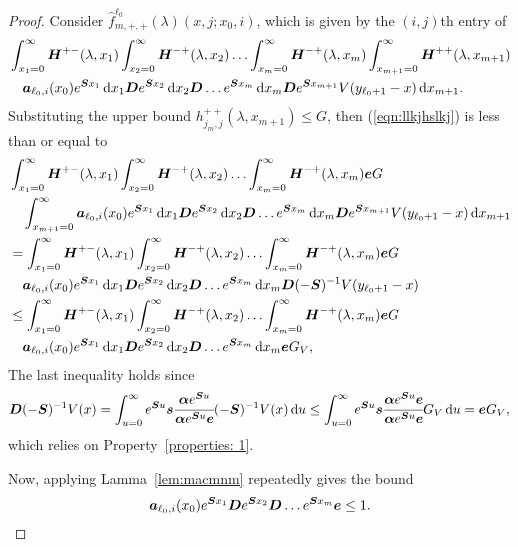 \begin{proof}
	Consider \(\widehat f^{\ell_0}_{m,+,+}(\lambda)(x,j;x_0,i) \), which is given by the \((i,j)\)th entry of
        \begin{align}
        	&\int_{x_1=0}^\infty \boldsymbol H^{+-}(\lambda,x_1)\nonumber
	\int_{x_2=0}^\infty \boldsymbol H^{-+}(\lambda,x_2) 
	\hdots \int_{x_m=0}^\infty \boldsymbol H^{-+}(\lambda, x_m) 
	\int_{x_{m+1}=0}^\infty \boldsymbol H^{++}(\lambda,x_{m+1}) 
	\\&\quad\boldsymbol   a_{\ell_0,i}(x_0)e^{\boldsymbol{S}x_1}\, \mathrm{d} x_1 \boldsymbol{D}e^{\boldsymbol{S}x_2} \, \mathrm{d} x_2 \boldsymbol{D}\dots e^{\boldsymbol{S}x_m} \, \mathrm{d} x_m \boldsymbol{D}e^{\boldsymbol{S}x_{m+1}}V(y_{\ell_0+1}-x) \, \mathrm{d} x_{m+1}. \label{eqn:llkjhslkj}
\end{align}
	Substituting the upper bound \(h^{++}_{j_m,j}(\lambda,x_{m+1})\leq G\), then (\ref{eqn:llkjhslkj}) is less than or equal to 
	\begin{align}
	&\int_{x_1=0}^\infty \boldsymbol H^{+-}(\lambda,x_1)\nonumber
	\int_{x_2=0}^\infty \boldsymbol H^{-+}(\lambda,x_2) 
	\hdots \int_{x_m=0}^\infty \boldsymbol H^{-+}(\lambda, x_m) \boldsymbol eG
	\\&\quad\int_{x_{m+1}=0}^\infty \boldsymbol   a_{\ell_0,i}(x_0)e^{\boldsymbol{S}x_1}\, \mathrm{d} x_1 \boldsymbol{D}e^{\boldsymbol{S}x_2} \, \mathrm{d} x_2 \boldsymbol{D}\dots e^{\boldsymbol{S}x_m} \, \mathrm{d} x_m \boldsymbol{D}e^{\boldsymbol{S}x_{m+1}}V(y_{\ell_0+1}-x)\, \mathrm{d} x_{m+1} \nonumber
	\\&=\int_{x_1=0}^\infty \boldsymbol H^{+-}(\lambda,x_1)\nonumber
	\int_{x_2=0}^\infty \boldsymbol H^{-+}(\lambda,x_2) 
	\hdots \int_{x_m=0}^\infty \boldsymbol H^{-+}(\lambda, x_m) \boldsymbol eG
	\\&\quad \boldsymbol   a_{\ell_0,i}(x_0)e^{\boldsymbol{S}x_1}\, \mathrm{d} x_1 \boldsymbol{D}e^{\boldsymbol{S}x_2} \, \mathrm{d} x_2 \boldsymbol{D}\dots e^{\boldsymbol{S}x_m} \, \mathrm{d} x_m \boldsymbol{D}(-\boldsymbol{S})^{-1}V(y_{\ell_0+1}-x) \nonumber
	\\&\leq\int_{x_1=0}^\infty \boldsymbol H^{+-} (\lambda,x_1)\nonumber
	\int_{x_2=0}^\infty \boldsymbol H^{-+} (\lambda,x_2) 
	\hdots \int_{x_m=0}^\infty \boldsymbol H^{-+} (\lambda, x_m) \boldsymbol eG
	\\&\quad\boldsymbol   a_{\ell_0,i}(x_0)e^{\boldsymbol{S}x_1}\, \mathrm{d} x_1 \boldsymbol{D}e^{\boldsymbol{S}x_2} \, \mathrm{d} x_2 \boldsymbol{D}\dots e^{\boldsymbol{S}x_m} \, \mathrm{d} x_m \boldsymbol eG_V, \label{eqn: this 12}	
        \end{align}
        The last inequality holds since 
        \[\boldsymbol D(-\boldsymbol S)^{-1}V(x) = \int_{u=0}^\infty e^{\boldsymbol Su}\boldsymbol s\cfrac{\boldsymbol \alpha e^{\boldsymbol S u}}{\boldsymbol \alpha e^{\boldsymbol S u}\boldsymbol e}(-\boldsymbol S)^{-1}V(x)\, \mathrm{d} u \leq \int_{u=0}^\infty e^{\boldsymbol Su}\boldsymbol s\cfrac{\boldsymbol \alpha e^{\boldsymbol S u}\boldsymbol e}{\boldsymbol \alpha e^{\boldsymbol S u}\boldsymbol e}G_V \, \mathrm{d} u= \boldsymbol eG_V,\]
        which relies on Property~\ref{properties: 1}. 
        
	Now, applying Lamma~\ref{lem:macmnm} repeatedly gives the bound  
	\[\boldsymbol   a_{\ell_0,i}(x_0)e^{\boldsymbol{S}x_1}\boldsymbol{D}e^{\boldsymbol{S}x_2} \boldsymbol{D}\dots e^{\boldsymbol{S}x_m} \boldsymbol e \leq 1.\]


\end{proof}
